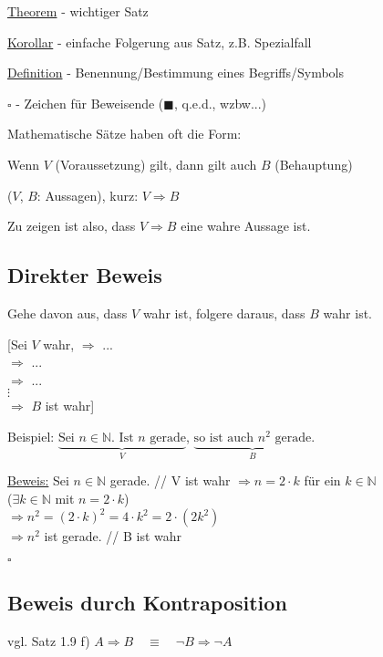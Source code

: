 \documentclass[a4paper, 12pt, twoside] {article}
\begin{document}
\underline{Theorem} - wichtiger Satz

\underline{Korollar} - einfache Folgerung aus Satz, z.B. Spezialfall

\underline{Definition} - Benennung/Bestimmung eines Begriffs/Symbols

$\square$ - Zeichen für Beweisende ($\blacksquare$, q.e.d., wzbw...)

\hfill

Mathematische Sätze haben oft die Form:

Wenn $V$ (Voraussetzung) gilt, dann gilt auch $B$ (Behauptung)

($V$, $B$: Aussagen), kurz: $V \Rightarrow B$

Zu zeigen ist also, dass $V \Rightarrow B$ eine wahre Aussage ist.

\subsection{Direkter Beweis}

Gehe davon aus, dass $V$ wahr ist, folgere daraus, dass $B$ wahr ist.

[\space\space Sei $V$ wahr, $\Rightarrow$ ... \\
\text{\qquad\qquad\qquad} $\Rightarrow$ ... \\
\text{\qquad\qquad\qquad} $\Rightarrow$ ... \\
\text{\qquad\qquad\qquad} \space $\vdots$ \\
\text{\qquad\qquad\qquad} $\Rightarrow$ $B$ ist wahr\space\space]

Beispiel: $\underbrace{\text{Sei $n \in \mathbb{N}$. Ist $n$ gerade}}_{V}$, $\underbrace{\text{so ist auch $n^2$ gerade}}_{B}.$

\underline{Beweis:} Sei $n \in \mathbb{N}$ gerade. \hfill // V ist wahr
$\Rightarrow n = 2 \cdot k$ für ein $k \in \mathbb{N}$ \\
\text{\qquad\qquad} ($\exists k \in \mathbb{N}$ mit $n = 2 \cdot k$) \\
$\Rightarrow n^2 = (2 \cdot k)^2 = 4 \cdot k^2 = 2 \cdot (2k^2)$ \\
$\Rightarrow n^2$ ist gerade. \hfill // B ist wahr

\hfill $\square$

\subsection{Beweis durch Kontraposition}

vgl. Satz 1.9 f) \qquad $A \Rightarrow B \quad \equiv \quad \neg B \Rightarrow \neg A$
\end{document}
